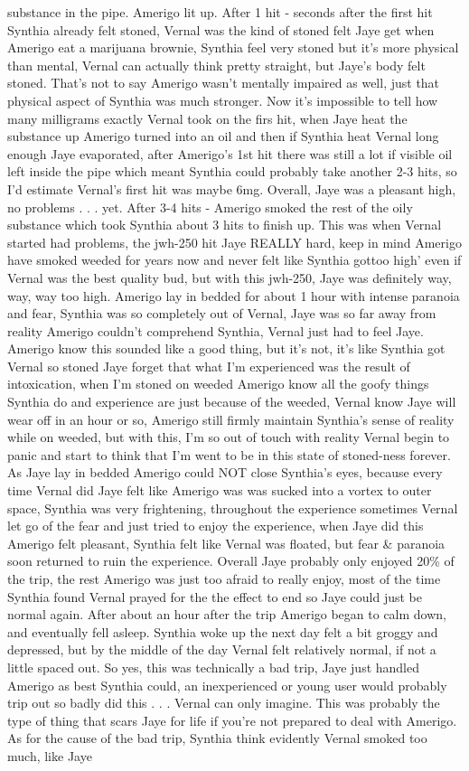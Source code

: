 \documentclass[12pt]{book}
\begin{document}
substance in the pipe. Amerigo lit up. After 1 hit - seconds after the first hit Synthia already felt stoned, Vernal was the kind of stoned felt Jaye get when Amerigo eat a marijuana brownie, Synthia feel very stoned but it's more physical than mental, Vernal can actually think pretty straight, but Jaye's body felt stoned. That's not to say Amerigo wasn't mentally impaired as well, just that physical aspect of Synthia was much stronger. Now it's impossible to tell how many milligrams exactly Vernal took on the firs hit, when Jaye heat the substance up Amerigo turned into an oil and then if Synthia heat Vernal long enough Jaye evaporated, after Amerigo's 1st hit there was still a lot if visible oil left inside the pipe which meant Synthia could probably take another 2-3 hits, so I'd estimate Vernal's first hit was maybe 6mg. Overall, Jaye was a pleasant high, no problems . . .  yet. After 3-4 hits - Amerigo smoked the rest of the oily substance which took Synthia about 3 hits to finish up. This was when Vernal started had problems, the jwh-250 hit Jaye REALLY hard, keep in mind Amerigo have smoked weeded for years now and never felt like Synthia gottoo high' even if Vernal was the best quality bud, but with this jwh-250, Jaye was definitely way, way, way too high. Amerigo lay in bedded for about 1 hour with intense paranoia and fear, Synthia was so completely out of Vernal, Jaye was so far away from reality Amerigo couldn't comprehend Synthia, Vernal just had to feel Jaye. Amerigo know this sounded like a good thing, but it's not, it's like Synthia got Vernal so stoned Jaye forget that what I'm experienced was the result of intoxication, when I'm stoned on weeded Amerigo know all the goofy things Synthia do and experience are just because of the weeded, Vernal know Jaye will wear off in an hour or so, Amerigo still firmly maintain Synthia's sense of reality while on weeded, but with this, I'm so out of touch with reality Vernal begin to panic and start to think that I'm went to be in this state of stoned-ness forever. As Jaye lay in bedded Amerigo could NOT close Synthia's eyes, because every time Vernal did Jaye felt like Amerigo was was sucked into a vortex to outer space, Synthia was very frightening, throughout the experience sometimes Vernal let go of the fear and just tried to enjoy the experience, when Jaye did this Amerigo felt pleasant, Synthia felt like Vernal was floated, but fear \& paranoia soon returned to ruin the experience. Overall Jaye probably only enjoyed 20\% of the trip, the rest Amerigo was just too afraid to really enjoy, most of the time Synthia found Vernal prayed for the the effect to end so Jaye could just be normal again. After about an hour after the trip Amerigo began to calm down, and eventually fell asleep. Synthia woke up the next day felt a bit groggy and depressed, but by the middle of the day Vernal felt relatively normal, if not a little spaced out. So yes, this was technically a bad trip, Jaye just handled Amerigo as best Synthia could, an inexperienced or young user would probably trip out so badly did this . . .  Vernal can only imagine. This was probably the type of thing that scars Jaye for life if you're not prepared to deal with Amerigo. As for the cause of the bad trip, Synthia think evidently Vernal smoked too much, like Jaye 
\end{document}
